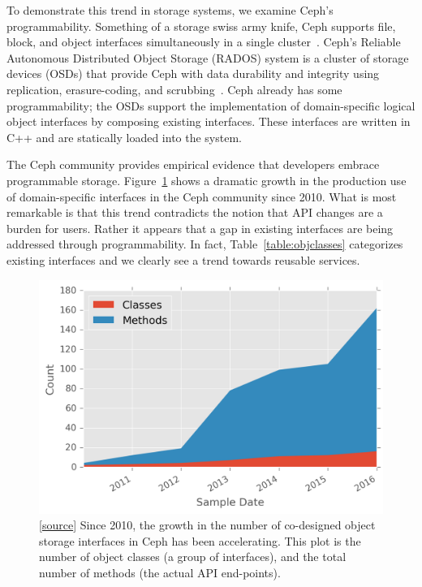 \documentclass[10pt,twocolumn]{article}
\begin{document}
To demonstrate this trend in storage systems, we examine Ceph's
programmability. Something of a storage swiss army knife, Ceph supports file,
block, and object interfaces simultaneously in a single
cluster~\cite{ceph_contributors_ceph_2010}. Ceph's Reliable Autonomous
Distributed Object Storage (RADOS) system is a cluster of storage devices
(OSDs) that provide Ceph with data durability and integrity using replication,
erasure-coding, and scrubbing~\cite{weil_rados_2007}. Ceph already has some
programmability; the OSDs support the implementation of domain-specific logical
object interfaces by composing existing interfaces. These interfaces are
written in C++ and are statically loaded into the system.


The Ceph community provides empirical evidence that developers embrace
programmable storage. Figure~\ref{fig:obj-int-dev-growth} shows a dramatic
growth in the production use of domain-specific interfaces in the Ceph
community since 2010.  What is most remarkable is that this trend contradicts
the notion that API changes are a burden for users.  Rather it appears that a
gap in existing interfaces are being addressed through programmability. In
fact, Table~\ref{table:objclasses} categorizes existing interfaces and we
clearly see a trend towards reusable services.

\begin{figure}[ht]
\centering
\includegraphics{figures/obj-int-dev-growth.png}
\caption{[\href{https://github.com/double-blind-submitter/osdi16}{source}]
Since 2010, the growth in the number of co-designed object storage interfaces
in Ceph has been accelerating. This plot is the number of object classes (a
group of interfaces), and the total number of methods (the actual API
end-points).}
\label{fig:obj-int-dev-growth}
\end{figure}
\end{document}

